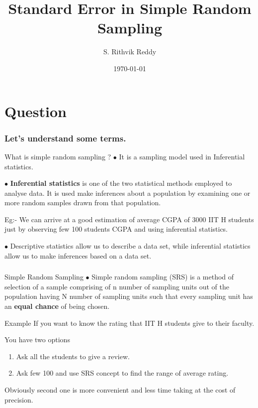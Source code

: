 \documentclass{beamer}
\title{Standard Error in Simple Random Sampling}
\author{S. Rithvik Reddy}
\institute{IIT H (CSE)}
\date{\today}
\begin{document}
\begin{frame}
\titlepage
\end{frame}
\section{Question}
\begin{frame}
\frametitle{Let's understand some terms.}
\begin{block}{What is simple random sampling ? }
$\bullet$ It is a sampling model used in Inferential statistics.

$\bullet$ \textbf{Inferential statistics}  is one of the two statistical methods employed to analyse data. It is used make inferences about a population by examining one or more random samples drawn from that population.

Eg:- We can arrive at a good estimation of average CGPA of 3000 IIT H students just by observing few 100 students CGPA and using inferential statistics.

$
\bullet$ Descriptive statistics allow us to describe a data set, while inferential statistics allow us to make inferences based on a data set.


\end{block}
\end{frame}

\begin{frame}
\frametitle{}
\begin{block}{Simple Random Sampling}
$\bullet$ Simple random sampling (SRS) is a method of selection of a sample comprising of n number of sampling units out of the population having N number of sampling units such that every sampling unit has an \textbf{equal chance} of being chosen. 
\end{block}

\begin{block}{Example}
If you want to know the rating that IIT H students give to their faculty.

You have two options
\begin{enumerate}
\item Ask all the students to give a review.
\item Ask few 100 and use SRS concept to find the range of average rating.
\end{enumerate} 
Obviously second one is more convenient and less time taking at the cost of precision.

\end{block}
\end{frame}
\end{document}
